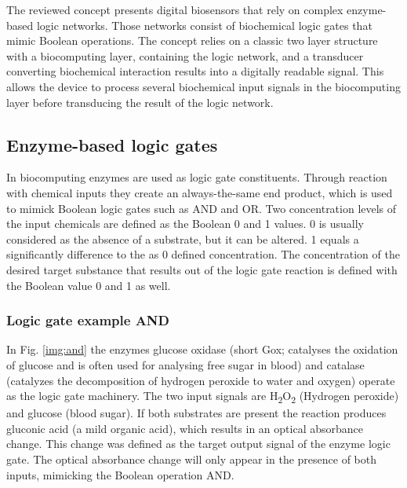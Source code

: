 \documentclass[runningheads]{llncs}
\begin{document}
The reviewed concept presents digital biosensors that rely on complex enzyme-based logic networks. Those networks consist of biochemical logic gates that mimic Boolean operations. The concept relies on a classic two layer structure with a biocomputing layer, containing the logic network, and a transducer converting biochemical interaction results into a digitally readable signal. This allows the device to process several biochemical input signals in the biocomputing layer before transducing the result of the logic network. \cite{application review}\cite{original}\cite{state of the art}


\subsection{Enzyme-based logic gates}		
		In biocomputing enzymes are used as logic gate constituents. Through reaction with chemical inputs they create an always-the-same end product, which is used to mimick Boolean logic gates such as AND and OR. Two concentration levels of the input chemicals are defined as the Boolean 0 and 1 values. 0 is usually considered as the absence of a substrate, but it can be altered. 1 equals a significantly difference to the as 0 defined concentration. 
		The concentration of the desired target substance that results out of the logic gate reaction is defined with the Boolean value 0 and 1 as well. \cite{original} \cite{haupt}
	
		\subsubsection{Logic gate example AND}
		In Fig. \ref{img:and} the enzymes glucose oxidase (short Gox; catalyses the oxidation of glucose and is often used for analysing free sugar in blood) and catalase (catalyzes the decomposition of hydrogen peroxide to water and oxygen) operate as the logic gate machinery. The two input signals are H\textsubscript{2}O\textsubscript{2} (Hydrogen peroxide) and glucose (blood sugar). If both substrates are present the reaction produces gluconic acid (a mild organic acid), which results in an optical absorbance change. This change was defined as the target output signal of the enzyme logic gate. The optical absorbance change will only appear in the presence of both inputs, mimicking the Boolean operation AND. \cite{original}\cite{haupt}\cite{chemie}

	
	
\end{document}
